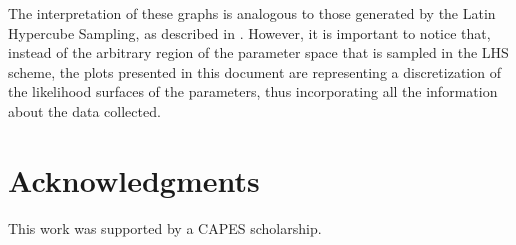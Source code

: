 \documentclass[twoside,12pt,a4paper]{article}
\begin{document}
The interpretation of these graphs is analogous to those generated by the Latin Hypercube
Sampling, as described in \citep{Chalom12}. However, it is important to notice that, instead of the 
arbitrary region of the parameter space that is sampled in the LHS scheme, the plots 
presented in this document are representing a discretization of the likelihood surfaces
of the parameters, thus incorporating all the information about the data collected.

\section*{Acknowledgments}
This work was supported by a CAPES scholarship.

\newpage


\end{document}
